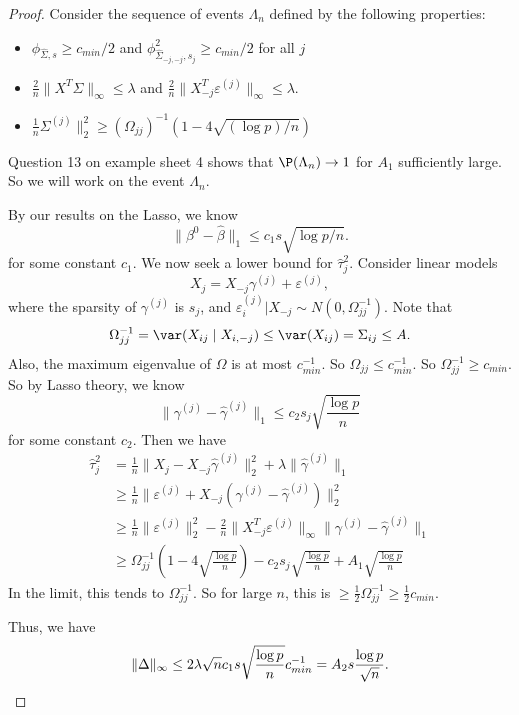 \documentclass[a4paper]{article}
\begin{document}
\begin{proof}
  Consider the sequence of events $\Lambda_n$ defined by the following properties:
  \begin{itemize}
    \item $\phi_{\hat{\Sigma}, s} \geq c_{min}/2$ and $\phi^2_{\hat{\Sigma}_{-j, -j}, s_j} \geq c_{min}/2$ for all $j$
    \item $\frac{2}{n} \|X^T \Sigma\|_\infty \leq \lambda$ and $\frac{2}{n} \|X_{-j}^T \varepsilon^{(j)} \|_\infty \leq \lambda$.
    \item $\frac{1}{n} \Sigma^{(j)} \|_2^2 \geq (\Omega_{jj})^{-1} (1 - 4 \sqrt{(\log p) / n})$
  \end{itemize}

  Question 13 on example sheet 4 shows that $\P(\Lambda_n) \to 1$ for $A_1$ sufficiently large. So we will work on the event $\Lambda_n$.

  By our results on the Lasso, we know
  \[
    \|\beta^0 - \hat{\beta}\|_1 \leq c_1 s \sqrt{\log p / n}.
  \]
  for some constant $c_1$. We now seek a lower bound for $\hat{\tau}_j^2$. Consider linear models
  \[
    X_j = X_{-j} \gamma^{(j)} + \varepsilon^{(j)},
  \]
  where the sparsity of $\gamma^{(j)}$ is $s_j$, and $\varepsilon_i^{(j)}| X_{-j} \sim N(0, \Omega_{jj}^{-1})$. Note that
  \[
    \Omega_{jj}^{-1} = \var (X_{ij} \mid X_{i, -j}) \leq \var(X_{ij}) = \Sigma_{ij} \leq A.
  \]
  Also, the maximum eigenvalue of $\Omega$ is at most $c_{min}^{-1}$. So $\Omega_{jj} \leq c_{min}^{-1}$. So $\Omega_{jj}^{-1} \geq c_{min}$. So by Lasso theory, we know
  \[
    \|\gamma^{(j)} - \hat{\gamma}^{(j)}\|_1 \leq c_2 s_j \sqrt{\frac{\log p}{n}}
  \]
  for some constant $c_2$. Then we have
  \begin{align*}
    \hat{\tau}_j^2 &= \frac{1}{n} \|X_j - X_{-j} \hat{\gamma}^{(j)} \|_2^2 + \lambda \|\hat{\gamma}^{(j)} \|_1\\
    &\geq \frac{1}{n} \|\varepsilon^{(j)} + X_{-j} (\gamma^{(j)} - \hat{\gamma}^{(j)})\|_2^2\\
    &\geq \frac{1}{n} \|\varepsilon^{(j)}\|_2^2 - \frac{2}{n} \|X_{-j}^T \varepsilon^{(j)}\|_\infty \|\gamma^{(j)} - \hat{\gamma}^{(j)}\|_1\\
    &\geq \Omega_{jj}^{-1} \left(1 - 4\sqrt{\frac{\log p}{n}}\right) - c_2 s_j \sqrt{\frac{\log p}{n}} + A_1 \sqrt{\frac{\log p}{n}}
  \end{align*}
  In the limit, this tends to $\Omega_{jj}^{-1}$. So for large $n$, this is $\geq \frac{1}{2} \Omega_{jj}^{-1} \geq \frac{1}{2} c_{min}$.

  Thus, we have
  \[
    \|\Delta\|_\infty \leq 2\lambda \sqrt{n} c_1 s \sqrt{\frac{\log p}{n}} c_{min}^{-1} = A_2 s \frac{\log p}{\sqrt{n}}.\qedhere
  \]
\end{proof}


\printindex
\end{document}
